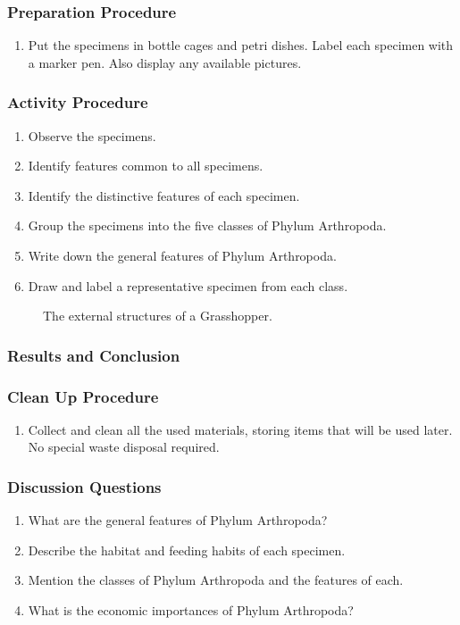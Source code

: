 \subsubsection*{Preparation Procedure}
\begin{enumerate}
\item{Put the specimens in bottle cages and petri dishes. Label each specimen with a marker pen. Also display any available pictures.}
\end{enumerate}

\subsubsection*{Activity Procedure}
\begin{enumerate}
\item{Observe the specimens.}
\item{Identify features common to all specimens.}
\item{Identify the distinctive features of each specimen.}
\item{Group the specimens into the five classes of Phylum Arthropoda.}
\item{Write down the general features of Phylum Arthropoda.}
\item{Draw and label a representative specimen from each class.}
\end{enumerate}

\begin{figure}[h]
\begin{center}
\def\svgwidth{12cm}

\caption{The external structures of a Grasshopper.}
\label{fig:fish}
\end{center}
\end{figure}

\subsubsection*{Results and Conclusion}


\subsubsection*{Clean Up Procedure}
\begin{enumerate}
\item{Collect and clean all the used materials, storing items that will be used later. No special waste disposal required.}
\end{enumerate}

\subsubsection*{Discussion Questions}
\begin{enumerate}
\item{What are the general features of Phylum Arthropoda?}
\item{Describe the habitat and feeding habits of each specimen.}
\item{Mention the classes of Phylum Arthropoda and the features of each.}
\item{What is the economic importances of Phylum Arthropoda?}
\end{enumerate}


